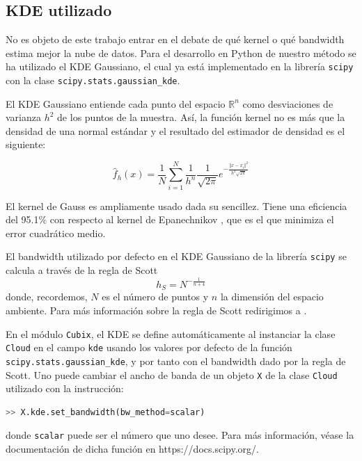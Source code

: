 \documentclass[12pt,a4paper,twoside]{article} %
\theoremstyle{plain}
\theoremstyle{definition}
\newcommand{\R}{\mathbb{R}}
\begin{document}
\subsection{KDE utilizado}
No es objeto de este trabajo entrar en el debate de qué kernel o qué bandwidth estima mejor la nube de datos. Para el desarrollo en Python de nuestro método se ha utilizado el KDE Gaussiano, el cual ya está implementado en la librería \texttt{scipy} con la clase \texttt{scipy.stats.gaussian\_kde}.

El KDE Gaussiano entiende cada punto del espacio $\R^n$ como desviaciones de varianza $h^2$ de los puntos de la muestra. Así, la función kernel no es más que la densidad de una normal estándar y el resultado del estimador de densidad es el siguiente:

$$ \hat{f}_h(x) = \frac{1}{N} \sum_{i=1}^{N} \frac{1}{h^n}\frac{1}{\sqrt{2\pi}}e^{-\frac{\Vert x - x_i \Vert ^2}{h^2\sqrt{2\pi}}} $$

El kernel de Gauss es ampliamente usado dada su sencillez. Tiene una eficiencia del 95.1\% con respecto al kernel de Epanechnikov \cite{Scheid}, que es el que minimiza el error cuadrático medio.

El bandwidth utilizado por defecto en el KDE Gaussiano de la librería \texttt{scipy} se calcula a través de la regla de Scott
$$ h_S = N^{-\frac{1}{n+4}} $$
donde, recordemos, $N$ es el número de puntos y $n$ la dimensión del espacio ambiente. Para más información sobre la regla de Scott redirigimos a \cite{Scott}.

En el módulo \texttt{Cubix}, el KDE se define automáticamente al instanciar la clase \texttt{Cloud} en el campo \texttt{kde} usando los valores por defecto de la función \texttt{scipy.stats.gaussian\_kde}, y por tanto con el bandwidth dado por la regla de Scott. Uno puede cambiar el ancho de banda de un objeto \texttt{X} de la clase \texttt{Cloud} utilizado con la instrucción:
\begin{lstlisting}[language=python]
  >> X.kde.set_bandwidth(bw_method=scalar)
\end{lstlisting}
donde \texttt{scalar} puede ser el número que uno desee. Para más información, véase la documentación de dicha función en https://docs.scipy.org/.

\end{document}

